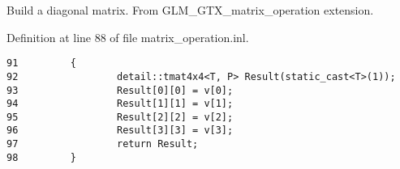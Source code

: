 Build a diagonal matrix. From GLM\_\-GTX\_\-matrix\_\-operation extension. 

Definition at line 88 of file matrix\_\-operation.inl.

\begin{Code}\begin{verbatim}91         {
92                 detail::tmat4x4<T, P> Result(static_cast<T>(1));
93                 Result[0][0] = v[0];
94                 Result[1][1] = v[1];
95                 Result[2][2] = v[2];
96                 Result[3][3] = v[3];
97                 return Result;          
98         }
\end{verbatim}
\end{Code}


